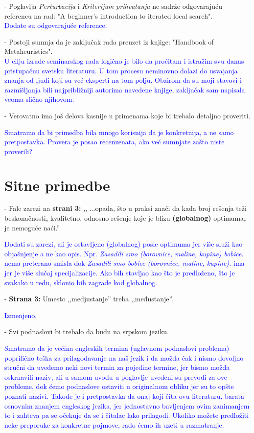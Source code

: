 \documentclass[a4paper]{report}
\newcommand{\odgovor}[1]{\textcolor{blue}{#1}}
\begin{document}
- Poglavlja {\em Perturbacija} i {\em Kriterijum prihvatanja} ne sadrže odgovarajuću referencu na rad: "A beginner's introduction to iterated local search".\\
\odgovor{Dodate su odgovarajuće reference.\\}

- Postoji sumnja da je zaključak rada preuzet iz knjige: "Handbook of Metaheuristics".\\
\odgovor{
U cilju izrade seminarskog rada logično je bilo da pročitam i istražim svu danas pristupačnu svetsku literaturu. U tom procesu neminovno dolazi do usvajanja znanja od ljudi koji su već eksperti na tom polju. Obzirom da su moji stavovi i razmišljanja bili najpribližniji autorima navedene knjige, zaključak sam napisala veoma slično njihovom. \\}

- Verovatno ima još delova kasnije u primenama koje bi trebalo detaljno proveriti.

\odgovor{Smatramo da bi primedba bila mnogo korisnija da je konkretnija, a ne samo pretpostavka. Provera je posao recenzenata, ako već sumnjate zašto niste proverili?\\}

\section{Sitne primedbe}
- Fale zarezi na \textbf{strani 3:} ,, ...opada, što u praksi znači da kada broj rešenja teži beskonačnosti\textbf{,} kvalitetno, odnosno rešenje koje
je blizu \textbf{(globalnog)} optimuma\textbf{,} je nemoguće naći.''

\odgovor{Dodati su zarezi, ali je ostavljeno (globalnog) posle optimuma jer više služi kao objašnjenje a ne kao opis. Npr. \textit{Zasadili smo (borovnice, maline, kupine) bobice.} nema preterano smisla dok 
\textit{Zasadili smo bobice (borovnice, maline, kupine).} ima jer je više slučaj specijalizacije. Ako bih stavljao kao što je predloženo, što je svakako u redu, sklonio bih zagrade kod globalnog.\\}

- \textbf{Strana 3:} Umesto ,,medjustanje'' treba ,,međustanje''.

\odgovor{Izmenjeno.\\}

- Svi podnaslovi bi trebalo da budu na srpskom jeziku.


\odgovor{Smatramo da je većina engleskih termina (uglavnom podnaslovi problema) poprilično teška za prilagođavanje na naš jezik i da možda čak i nismo dovoljno stručni da uvedemo neki novi termin za pojedine termine, jer bismo možda oskrnavili naziv, ali u samom uvodu u poglavlje uvedeni su prevodi za ove probleme, dok ćemo podnaslove ostaviti u originalnom obliku jer su to opšte poznati nazivi. Takođe je i pretpostavka da onaj koji čita ovu literaturu, barata osnovnim znanjem engleskog jezika, jer jednostavno bavljenjem ovim zanimanjem to i zahteva pa se očekuje da se i čitalac lako prilagodi. Ukoliko možete predložiti neke preporuke za konkretne pojmove, rado ćemo ih uzeti u razmatranje.\\}
\end{document}
